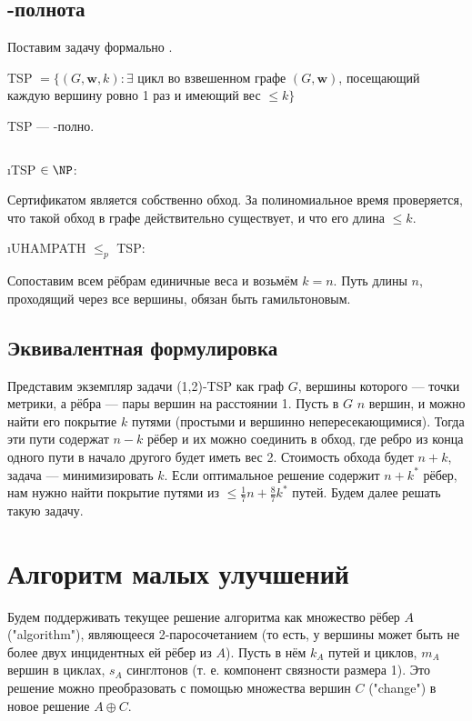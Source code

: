 \subsection{\NP-полнота}
Поставим задачу формально .

TSP $= \{ (G, \mathbf{w}, k): \exists$ цикл во взвешенном графе $(G, \mathbf{w})$, посещающий каждую вершину ровно 1 раз и имеющий вес $\le k \}$

\begin{theorem}
	TSP --- \NP-полно.
\end{theorem}
\begin{Proof}
 $ $
 
 \begin{itemize}
  \i TSP $\in \NP$\cite{BA09}:
 
  Сертификатом является собственно обход. За полиномиальное время проверяется, что такой обход в графе действительно существует, и что его длина $\le k$.
 
  \i UHAMPATH $\le_p$ TSP:
 
  Сопоставим всем рёбрам единичные веса и возьмём $k = n$. Путь длины $n$, проходящий через все вершины, обязан быть гамильтоновым.
 \end{itemize}
\end{Proof}

\subsection{Эквивалентная формулировка}
Представим экземпляр задачи (1,2)-TSP как граф $G$, вершины которого --- точки метрики, а рёбра --- пары вершин на расстоянии 1. Пусть в $G$ $n$ вершин, и можно найти его покрытие $k$ путями (простыми и вершинно непересекающимися). Тогда эти пути содержат $n-k$ рёбер и их можно соединить в обход, где ребро из конца одного пути в начало другого будет иметь вес 2. Стоимость обхода будет $n+k$, задача --- минимизировать $k$. Если оптимальное решение содержит $n+k^*$ рёбер, нам нужно найти покрытие путями из $\le \frac{1}{7}n+\frac{8}{7}k^*$ путей. Будем далее решать такую задачу.

\section{Алгоритм малых улучшений}
Будем поддерживать текущее решение алгоритма как множество рёбер $A$ ("algorithm"), являющееся 2-паросочетанием (то есть, у вершины может быть не более двух инцидентных ей рёбер из $A$). Пусть в нём $k_A$ путей и циклов, $m_A$ вершин в циклах, $s_A$ синглтонов (т. е. компонент связности размера 1). Это решение можно преобразовать с помощью множества вершин $C$ ("change") в новое решение $A \oplus C$. 


